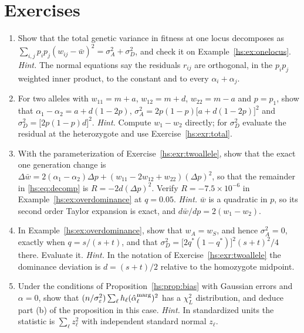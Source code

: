 \section{Exercises}
\label{hs:sec:exercises}

\begin{enumerate}[label=\arabic*.,leftmargin=*,itemsep=4pt]
\item\label{hs:exr:total} Show that the total genetic variance in fitness at one locus decomposes as $\sum_{i,j}p_ip_j(w_{ij}-\bar w)^2 = \sigma^2_A + \sigma^2_D$, and check it on Example~\ref{hs:ex:onelocus}.
\emph{Hint.} The normal equations say the residuals $r_{ij}$ are orthogonal, in the $p_ip_j$ weighted inner product, to the constant and to every $\alpha_i + \alpha_j$.

\item\label{hs:exr:twoallele} For two alleles with $w_{11} = m + a$, $w_{12} = m + d$, $w_{22} = m - a$ and $p = p_1$, show that $\alpha_1 - \alpha_2 = a + d(1-2p)$, $\sigma^2_A = 2p(1-p)\big[a + d(1-2p)\big]^2$ and $\sigma^2_D = \big[2p(1-p)d\big]^2$.
\emph{Hint.} Compute $w_1 - w_2$ directly; for $\sigma^2_D$ evaluate the residual at the heterozygote and use Exercise~\ref{hs:exr:total}.

\item\label{hs:exr:remainder} With the parameterization of Exercise~\ref{hs:exr:twoallele}, show that the exact one generation change is $\Delta\bar w = 2(\alpha_1-\alpha_2)\Delta p + (w_{11} - 2w_{12} + w_{22})(\Delta p)^2$, so that the remainder in \eqref{hs:eq:decomp} is $R = -2d(\Delta p)^2$. Verify $R = -7.5\times10^{-6}$ in Example~\ref{hs:ex:overdominance} at $q = 0.05$.
\emph{Hint.} $\bar w$ is a quadratic in $p$, so its second order Taylor expansion is exact, and $d\bar w/dp = 2(w_1 - w_2)$.

\item In Example~\ref{hs:ex:overdominance}, show that $w_A = w_S$, and hence $\sigma^2_A = 0$, exactly when $q = s/(s+t)$, and that $\sigma^2_D = \big[2q^*(1-q^*)\big]^2(s+t)^2/4$ there. Evaluate it.
\emph{Hint.} In the notation of Exercise~\ref{hs:exr:twoallele} the dominance deviation is $d = (s+t)/2$ relative to the homozygote midpoint.

\item Under the conditions of Proposition~\ref{hs:prop:bias} with Gaussian errors and $\alpha = 0$, show that $(n/\sigma^2_\varepsilon)\sum_\ell h_\ell(\hat\alpha^{\rm marg}_\ell)^2$ has a $\chi^2_L$ distribution, and deduce part (b) of the proposition in this case.
\emph{Hint.} In standardized units the statistic is $\sum_\ell z_\ell^2$ with independent standard normal $z_\ell$.


\end{enumerate}
